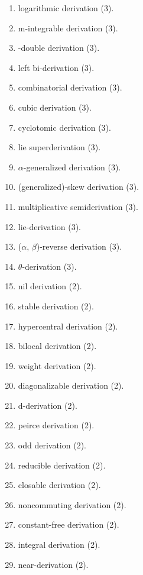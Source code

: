 \begin{enumerate}
\item \allowbreak logarithmic derivation \hfill(3).
\item \allowbreak m-integrable derivation \hfill(3).
\item \allowbreak *-double derivation \hfill(3).
\item \allowbreak left bi-derivation \hfill(3).
\item \allowbreak combinatorial derivation \hfill(3).
\item \allowbreak cubic derivation \hfill(3).
\item \allowbreak cyclotomic derivation \hfill(3).
\item \allowbreak lie superderivation \hfill(3).
\item \allowbreak $\alpha$-generalized derivation \hfill(3).
\item \allowbreak (generalized)-skew derivation \hfill(3).
\item \allowbreak multiplicative semiderivation \hfill(3).
\item \allowbreak lie-derivation \hfill(3).
\item \allowbreak ($\alpha$, $\beta$)-reverse derivation \hfill(3).
\item \allowbreak $\theta$-derivation \hfill(3).
\item \allowbreak nil derivation \hfill(2).
\item \allowbreak stable derivation \hfill(2).
\item \allowbreak hypercentral derivation \hfill(2).
\item \allowbreak bilocal derivation \hfill(2).
\item \allowbreak weight derivation \hfill(2).
\item \allowbreak diagonalizable derivation \hfill(2).
\item \allowbreak d-derivation \hfill(2).
\item \allowbreak peirce derivation \hfill(2).
\item \allowbreak odd derivation \hfill(2).
\item \allowbreak reducible derivation \hfill(2).
\item \allowbreak closable derivation \hfill(2).
\item \allowbreak noncommuting derivation \hfill(2).
\item \allowbreak constant-free derivation \hfill(2).
\item \allowbreak integral derivation \hfill(2).
\item \allowbreak near-derivation \hfill(2).

\end{enumerate}
